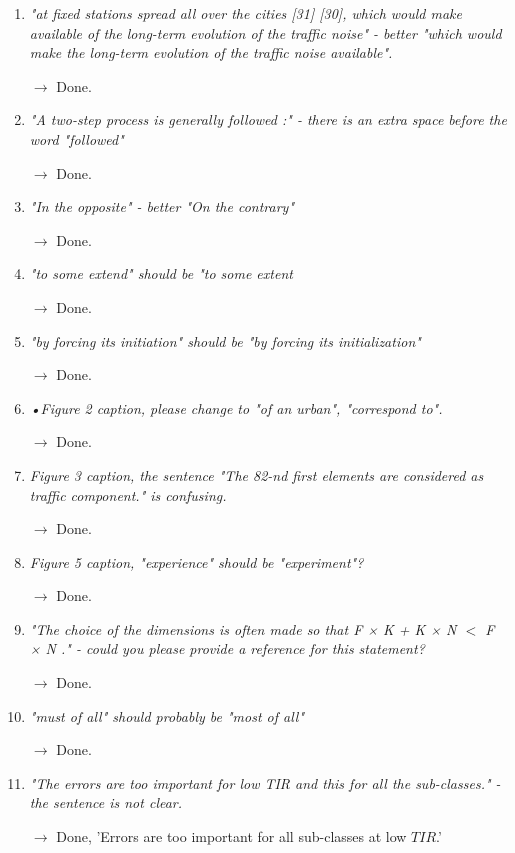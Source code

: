 \documentclass[10pt]{article}
\begin{document}
\begin{enumerate}
\item \emph{"at fixed stations spread all over the cities [31] [30], which would make available of the long-term evolution of the traffic noise" - better "which would make the long-term evolution of the traffic noise available".}

$\rightarrow$ Done.

\item \emph{"A two-step process is generally followed :" - there is an extra space before the word "followed" }

$\rightarrow$ Done.

\item \emph{"In the opposite" - better "On the contrary"}

$\rightarrow$ Done.

\item \emph{"to some extend" should be "to some extent}

$\rightarrow$ Done.

\item \emph{"by forcing its initiation" should be "by forcing its initialization"}

$\rightarrow$ Done.

\item \emph{•Figure 2 caption, please change to "of an urban", "correspond to".}

$\rightarrow$ Done.

\item \emph{Figure 3 caption, the sentence "The 82-nd first elements are considered as traffic component." is confusing.}

$\rightarrow$ Done.

\item \emph{Figure 5 caption, "experience" should be "experiment"?}

$\rightarrow$ Done.

\item \emph{"The choice of the dimensions is often made so that F × K + K × N $<$ F × N ." - could you please provide a reference for this statement? }

$\rightarrow$ Done.

\item \emph{"must of all" should probably be "most of all" }

$\rightarrow$ Done.

\item \emph{"The errors are too important for low TIR and this for all the sub-classes." - the sentence is not clear.}

$\rightarrow$ Done, 'Errors are too important for all sub-classes at low $TIR$.'

\end{enumerate}
\end{document}
